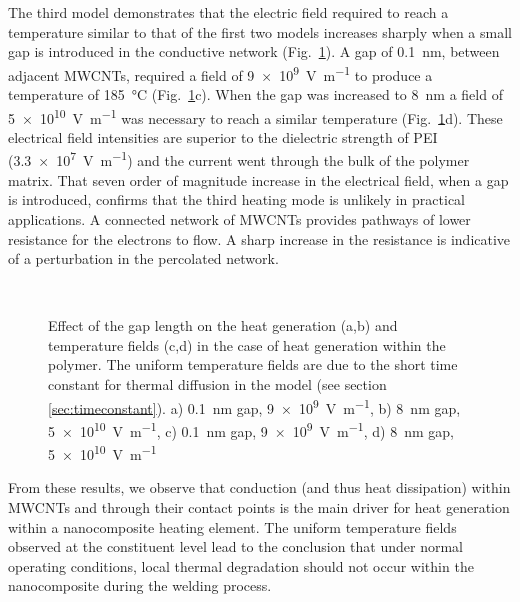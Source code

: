 The third model demonstrates that the electric field required to reach a temperature similar to that of the first two models increases sharply when a small gap is introduced in the conductive network (Fig.~\ref{fig:result_gap}). 
A gap of \SI{0.1}{\nano\metre}, between adjacent MWCNTs, required a field of \SI{9e9}{\volt\per\metre} to produce a temperature of \SI{185}{\celsius} (Fig.~\ref{fig:result_gap}c). 
When the gap was increased to \SI{8}{\nano\metre} a field of \SI{5e10}{\volt\per\metre} was necessary to reach a similar temperature (Fig.~\ref{fig:result_gap}d). 
These electrical field intensities are superior to the dielectric strength of PEI (\SI{3.3e7}{\volt\per\metre}) and the current went through the bulk of the polymer matrix. 
That seven order of magnitude increase in the electrical field, when a gap is introduced, confirms that the third heating mode is unlikely in practical applications. 
A connected network of MWCNTs provides pathways of lower resistance for the electrons to flow. 
A sharp increase in the resistance is indicative of a perturbation in the percolated network. 

\begin{figure}[h!]
	\centering
	 \\
	\caption{Effect of the gap length on the heat generation (a,b) and temperature fields (c,d) in the case of heat generation within the polymer. The uniform temperature fields are due to the short time constant for thermal diffusion in the model (see section \ref{sec:timeconstant}).  a) \SI{0.1}{\nano\metre} gap, \SI{9e9}{\volt\per\metre}, b) \SI{8}{\nano\metre} gap, \SI{5e10}{\volt\per\metre}, c) \SI{0.1}{\nano\metre} gap, \SI{9e9}{\volt\per\metre}, d) \SI{8}{\nano\metre} gap, \SI{5e10}{\volt\per\metre} \cite{Brassard2018_figshare_article1}}
	\label{fig:result_gap}
\end{figure}

From these results, we observe that conduction (and thus heat dissipation) within MWCNTs and through their contact points is the main driver for heat generation within a nanocomposite heating element. 
The uniform temperature fields observed at the constituent level lead to the conclusion that under normal operating conditions, local thermal degradation should not occur within the nanocomposite during the welding process. 

